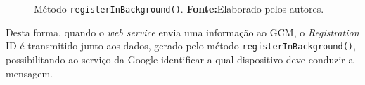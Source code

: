 	\begin{figure}[h!] 
		
		\caption[Método registerInBackground()]{Método
		\texttt{registerInBackground()}.
		\textbf{Fonte:}Elaborado pelos autores.}
		\label{fig:app22}
	\end{figure}
	
	\par Desta forma, quando o \textit{web service} envia uma informação ao GCM, o
\textit{Registration} ID é transmitido junto aos dados, gerado pelo método
\texttt{registerInBackground()}, possibilitando ao serviço da Google
identificar a qual dispositivo deve conduzir a mensagem.